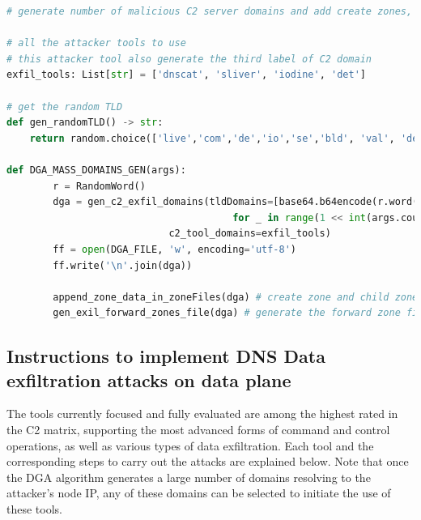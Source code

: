 \documentclass [11pt, proquest] {uwthesis}[2020/02/24]
\begin{document}
\vspace{-0.5em}
{\footnotesize
\begin{lstlisting}[language=Python, 
    caption={Domain Generation Algorithm}, 
    label={lst:dga},
    aboveskip=0.5em,
    belowskip=0.5em
]
# generate number of malicious C2 server domains and add create zones, child zones NS links inside DNS server

# all the attacker tools to use 
# this attacker tool also generate the third label of C2 domain
exfil_tools: List[str] = ['dnscat', 'sliver', 'iodine', 'det']

# get the random TLD
def gen_randomTLD() -> str:
    return random.choice(['live','com','de','io','se','bld', 'val', 'def', 'head'])

def DGA_MASS_DOMAINS_GEN(args):
        r = RandomWord()
        dga = gen_c2_exfil_domains(tldDomains=[base64.b64encode(r.word()).lower() + "." + gen_randomTLD()
                                       for _ in range(1 << int(args.count))], 
                            c2_tool_domains=exfil_tools)
        ff = open(DGA_FILE, 'w', encoding='utf-8')
        ff.write('\n'.join(dga))

        append_zone_data_in_zoneFiles(dga) # create zone and child zones
        gen_exil_forward_zones_file(dga) # generate the forward zone file 
\end{lstlisting}
}
\vspace{-1em}

\subsection{Instructions to implement DNS Data exfiltration attacks on data plane}
The tools currently focused and fully evaluated are among the highest rated in the C2 matrix, supporting the most advanced forms of command and control operations, as well as various types of data exfiltration. Each tool and the corresponding steps to carry out the attacks are explained below. Note that once the DGA algorithm generates a large number of domains resolving to the attacker’s node IP, any of these domains can be selected to initiate the use of these tools.
\end{document}
